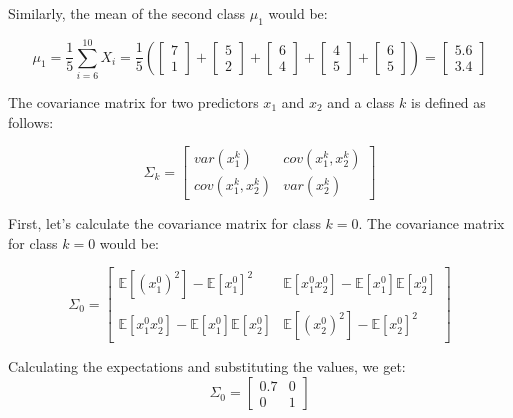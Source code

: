 \documentclass{article}
\begin{document}
Similarly, the mean of the second class $\mu_1$ would be:

\begin{equation}
  \mu_1 = \frac{1}{5} \sum_{i=6}^{10} X_i = \frac{1}{5} \left( \begin{bmatrix} 7 \\ 1 \end{bmatrix} + \begin{bmatrix} 5 \\ 2 \end{bmatrix} + \begin{bmatrix} 6 \\ 4 \end{bmatrix} + \begin{bmatrix} 4 \\ 5 \end{bmatrix} + \begin{bmatrix} 6 \\ 5 \end{bmatrix} \right) = \begin{bmatrix} 5.6 \\ 3.4 \end{bmatrix}
\end{equation}

The covariance matrix for two predictors $x_1$ and $x_2$ and a class $k$ is defined as follows:

\begin{equation}
  \Sigma_k = \begin{bmatrix}
    var(x^k_1) & cov(x^k_1, x^k_2) \\
    cov(x^k_1, x^k_2) & var(x^k_2)
  \end{bmatrix}
\end{equation}

First, let's calculate the covariance matrix for class $k = 0$. The covariance matrix for class $k = 0$ would be:

\begin{equation}
  \Sigma_0 = \begin{bmatrix}
    \mathbb{E}[(x^0_1)^2] - \mathbb{E}[x^0_1]^2 & \mathbb{E}[x^0_1x^0_2] - \mathbb{E}[x^0_1]\mathbb{E}[x^0_2] \\
    \\
    \mathbb{E}[x^0_1x^0_2] - \mathbb{E}[x^0_1]\mathbb{E}[x^0_2] & \mathbb{E}[(x^0_2)^2] - \mathbb{E}[x^0_2]^2
  \end{bmatrix}
\end{equation}

Calculating the expectations and substituting the values, we get:
\begin{equation}
  \Sigma_0 = \begin{bmatrix}
    0.7 & 0 \\
    0 & 1
  \end{bmatrix}
\end{equation}
\end{document}
